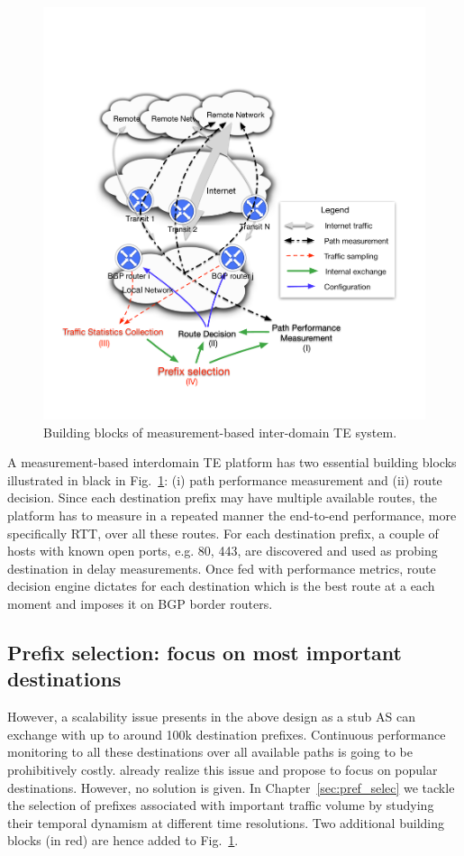 \begin{figure}[!htb]
\centering
\includegraphics[width=\textwidth]{gfx/chap1/archi.pdf}
\caption{Building blocks of measurement-based inter-domain TE system.}
\label{fig:archi}
\end{figure}

A measurement-based interdomain TE platform has two essential building blocks illustrated in black in Fig.~\ref{fig:archi}: (i) path performance measurement and (ii) route decision.
Since each destination prefix may have multiple available routes, the platform has to measure in a repeated manner the end-to-end performance, more specifically \acf{RTT}, over all these routes. 
For each destination prefix, a couple of hosts with known open ports, e.g. 80, 443, are discovered and used as probing destination in delay measurements.
Once fed with performance metrics, route decision engine dictates for each destination which is the best route at a each moment and imposes it on BGP border routers.

\subsection{Prefix selection: focus on most important destinations}
However, a scalability issue presents in the above design as a stub AS can exchange with up to around 100k destination prefixes.
Continuous performance monitoring to all these destinations over all available paths is going to be prohibitively costly.
\citet{Feamster2003} already realize this issue and propose to focus on popular destinations.
However, no solution is given.
In Chapter~\ref{sec:pref_selec} we tackle the selection of prefixes associated with important traffic volume by studying their temporal dynamism at different time resolutions. Two additional building blocks (in red) are hence added to Fig.~\ref{fig:archi}.

